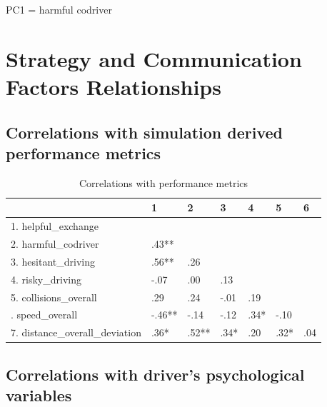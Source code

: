 \documentclass[]{article}
\begin{document}
PC1 = harmful codriver

\newpage

\hypertarget{strategy-and-communication-factors-relationships}{%
\section{Strategy and Communication Factors
Relationships}\label{strategy-and-communication-factors-relationships}}

\hypertarget{correlations-with-simulation-derived-performance-metrics}{%
\subsection{Correlations with simulation derived performance
metrics}\label{correlations-with-simulation-derived-performance-metrics}}

\begin{table}[H]

\caption{\label{tab:unnamed-chunk-16}Correlations with performance metrics}
\centering
\fontsize{6}{8}\selectfont
\begin{tabular}[t]{lllllll}
\toprule
  & 1 & 2 & 3 & 4 & 5 & 6\\
\midrule
1. helpful\_exchange &  &  &  &  &  & \\
2. harmful\_codriver & .43** &  &  &  &  & \\
3. hesitant\_driving & .56** & .26 &  &  &  & \\
4. risky\_driving & -.07 & .00 & .13 &  &  & \\
5. collisions\_overall & .29 & .24 & -.01 & .19 &  & \\
\addlinespace
6. speed\_overall & -.46** & -.14 & -.12 & .34* & -.10 & \\
7. distance\_overall\_deviation & .36* & .52** & .34* & .20 & .32* & .04\\
\bottomrule
\end{tabular}
\end{table}

\newpage

\hypertarget{correlations-with-drivers-psychological-variables}{%
\subsection{Correlations with driver's psychological
variables}\label{correlations-with-drivers-psychological-variables}}
\end{document}
